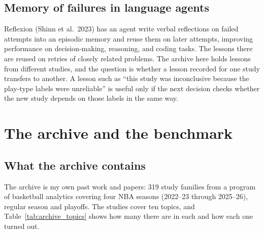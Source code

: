 \documentclass[11pt]{article}
\begin{document}
\subsection{Memory of failures in language agents}

Reflexion (Shinn et al.\ 2023) has an agent write verbal reflections on failed attempts into an episodic memory and reuse them on later attempts, improving performance on decision-making, reasoning, and coding tasks. The lessons there are reused on retries of closely related problems. The archive here holds lessons from different studies, and the question is whether a lesson recorded for one study transfers to another. A lesson such as ``this study was inconclusive because the play-type labels were unreliable'' is useful only if the next decision checks whether the new study depends on those labels in the same way.

\section{The archive and the benchmark}
\label{sec:archive}

\subsection{What the archive contains}

The archive is my own past work and papers: 319 study families from a program of basketball analytics covering four NBA seasons (2022--23 through 2025--26), regular season and playoffs. The studies cover ten topics, and Table~\ref{tab:archive_topics} shows how many there are in each and how each one turned out.
\end{document}
